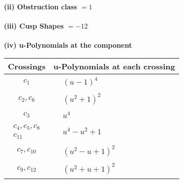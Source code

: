 \documentclass[1p]{elsarticle_modified}
\theoremstyle{definition}
\begin{document}
\flushleft \textbf{(ii) Obstruction class $= 1$}\\~\\
\flushleft \textbf{(iii) Cusp Shapes $= -12$}\\~\\
\newpage\renewcommand{\arraystretch}{1}
\flushleft \textbf{(iv) u-Polynomials at the component}\newline \\
\begin{tabular}{m{50pt}|m{274pt}}
Crossings & \hspace{64pt}u-Polynomials at each crossing \\
\hline $$\begin{aligned}c_{1}\end{aligned}$$&$\begin{aligned}
&(u-1)^4
\end{aligned}$\\
\hline $$\begin{aligned}c_{2},c_{6}\end{aligned}$$&$\begin{aligned}
&(u^2+1)^2
\end{aligned}$\\
\hline $$\begin{aligned}c_{3}\end{aligned}$$&$\begin{aligned}
&u^4
\end{aligned}$\\
\hline $$\begin{aligned}c_{4},c_{5},c_{8}\\c_{11}\end{aligned}$$&$\begin{aligned}
&u^4- u^2+1
\end{aligned}$\\
\hline $$\begin{aligned}c_{7},c_{10}\end{aligned}$$&$\begin{aligned}
&(u^2- u+1)^2
\end{aligned}$\\
\hline $$\begin{aligned}c_{9},c_{12}\end{aligned}$$&$\begin{aligned}
&(u^2+u+1)^2
\end{aligned}$\\
\hline
\end{tabular}\\~\\
\end{document}
